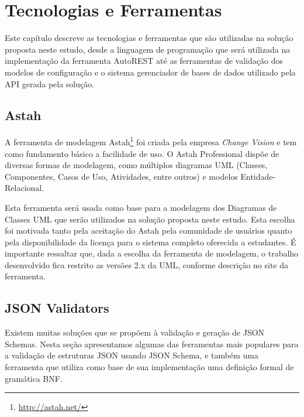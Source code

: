 \chapter{Tecnologias e Ferramentas}
\label{chap:tecno}

Este capítulo descreve as tecnologias e ferramentas que são utilizadas na solução proposta neste estudo, desde a linguagem de programação que será utilizada na implementação da ferramenta AutoREST até as ferramentas de validação dos modelos de configuração e o sistema gerenciador de bases de dados utilizado pela API gerada pela solução.


\section{Astah}

A ferramenta de modelagem Astah\footnote{\url{http://astah.net/}} foi criada pela empresa \textit{Change Vision} e tem como fundamento básico a facilidade de uso. O Astah Professional dispõe de diversas formas de modelagem, como múltiplos diagramas UML (Classes, Componentes, Casos de Uso, Atividades, entre outros) e modelos Entidade-Relacional.

Esta ferramenta será usada como base para a modelagem dos Diagramas de Classes UML que serão utilizados na solução proposta neste estudo. Esta escolha foi motivada tanto pela aceitação do Astah pela comunidade de usuários quanto pela disponibilidade da licença para o sistema completo oferecida a estudantes. É importante ressaltar que, dada a escolha da ferramenta de modelagem, o trabalho desenvolvido fica restrito as versões 2.x da UML, conforme descrição no site da ferramenta.


\section{JSON Validators}

Existem muitas soluções que se propõem à validação e geração de JSON Schemas. Nesta seção apresentamos algumas das ferramentas mais populares para a validação de estruturas JSON usando JSON Schema, e também uma ferramenta que utiliza como base de sua implementação uma definição formal de gramática BNF.


